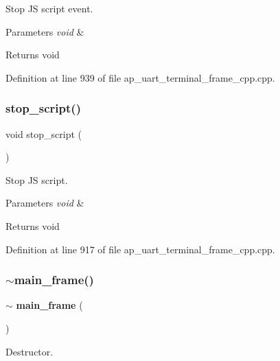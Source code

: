 Stop JS script event. 


\begin{DoxyParams}{Parameters}
{\em void} & \\
\hline
\end{DoxyParams}
\begin{DoxyReturn}{Returns}
void 
\end{DoxyReturn}


Definition at line 939 of file ap\+\_\+uart\+\_\+terminal\+\_\+frame\+\_\+cpp.\+cpp.

\mbox{\label{group___u_a_r_t__terminal_gafc1cdeea260c14de2dcb9415ebcc15f9}} 
\subsubsection{stop\_script()}
{\footnotesize\ttfamily void stop\+\_\+script (\begin{DoxyParamCaption}\item[{void}]{ }\end{DoxyParamCaption})}



Stop JS script. 


\begin{DoxyParams}{Parameters}
{\em void} & \\
\hline
\end{DoxyParams}
\begin{DoxyReturn}{Returns}
void 
\end{DoxyReturn}


Definition at line 917 of file ap\+\_\+uart\+\_\+terminal\+\_\+frame\+\_\+cpp.\+cpp.

\mbox{\label{group___u_a_r_t__terminal_gaf3820c86d5633619d8e1baddfcbb5042}} 
\subsubsection{$\sim$main\_frame()}
{\footnotesize\ttfamily $\sim$\textbf{ main\+\_\+frame} (\begin{DoxyParamCaption}{ }\end{DoxyParamCaption})\hspace{0.3cm}{\ttfamily [virtual]}}



Destructor. 


